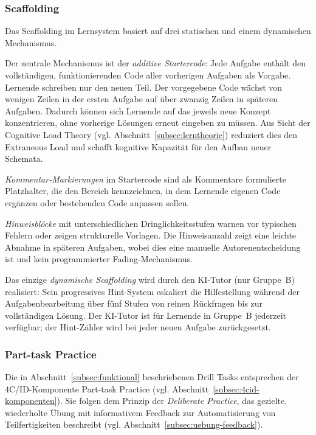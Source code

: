 \subsubsection{Scaffolding}

Das Scaffolding im Lernsystem basiert auf drei statischen und einem dynamischen Mechanismus.

Der zentrale Mechanismus ist der \textit{additive Startercode}: Jede Aufgabe enthält den vollständigen, funktionierenden Code aller vorherigen Aufgaben als Vorgabe.
Lernende schreiben nur den neuen Teil.
Der vorgegebene Code wächst von wenigen Zeilen in der ersten Aufgabe auf über zwanzig Zeilen in späteren Aufgaben.
Dadurch können sich Lernende auf das jeweils neue Konzept konzentrieren, ohne vorherige Lösungen erneut eingeben zu müssen.
Aus Sicht der Cognitive Load Theory (vgl. Abschnitt~\ref{subsec:lerntheorie}) reduziert dies den Extraneous Load und schafft kognitive Kapazität für den Aufbau neuer Schemata.

\textit{Kommentar-Markierungen} im Startercode sind als Kommentare formulierte Platzhalter, die den Bereich kennzeichnen, in dem Lernende eigenen Code ergänzen oder bestehenden Code anpassen sollen.

\textit{Hinweisblöcke} mit unterschiedlichen Dringlichkeitsstufen warnen vor typischen Fehlern oder zeigen strukturelle Vorlagen.
Die Hinweisanzahl zeigt eine leichte Abnahme in späteren Aufgaben, wobei dies eine manuelle Autorenentscheidung ist und kein programmierter Fading-Mechan\-ismus.

Das einzige \textit{dynamische Scaffolding} wird durch den KI-Tutor (nur Gruppe~B) realisiert: Sein progressives Hint-System eskaliert die Hilfestellung während der Aufgabenbearbeitung über fünf Stufen von reinen Rückfragen bis zur vollständigen Lösung.
Der KI-Tutor ist für Lernende in Gruppe~B jederzeit verfügbar; der Hint-Zähler wird bei jeder neuen Aufgabe zurückgesetzt.

\subsubsection{Part-task Practice}

Die in Abschnitt~\ref{subsec:funktional} beschriebenen Drill Tasks entsprechen der 4C/ID-Komponente Part-task Practice (vgl. Abschnitt~\ref{subsec:4cid-komponenten}). Sie folgen dem Prinzip der \textit{Deliberate Practice}, das gezielte, wiederholte Übung mit informativem Feedback zur Automatisierung von Teilfertigkeiten beschreibt (vgl. Abschnitt~\ref{subsec:uebung-feedback}).

